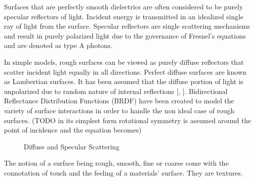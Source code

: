 Surfaces that are perfectly smooth dielectrics are often considered to be purely specular reflectors of light.  Incident energy is transmitted in an idealized single ray of light from the surface.  Specular reflectors are single scattering mechanisms and result in purely polarized light due to the governance of Fresnel’s equations and are denoted as type A photons.

In simple models, rough surfaces can be viewed as purely diffuse reflectors that scatter incident light equally in all directions.  Perfect diffuse surfaces are known as Lambertian surfaces.  It has been assumed that the diffuse portion of light is unpolarized due to random nature of internal reflections [\cite{specularclass}, \cite{grant}]. Bidirectional Reflectance Distribution Functions (BRDF) have been created to model the variety of surface interactions in order to handle the non ideal case of rough surfaces. (TODO in its simplest form rotational symmetry is assumed around the point of incidence and the equation becomes)
\begin{figure}[!htb]
    \begin{center}
    \end{center}
    \caption{Diffuse and Specular Scattering}
    \label{fig:scattering}
\end{figure}

The notion of a surface being rough, smooth, fine or coarse come with the connotation of touch and the feeling of a materials' surface.  They are textures.
